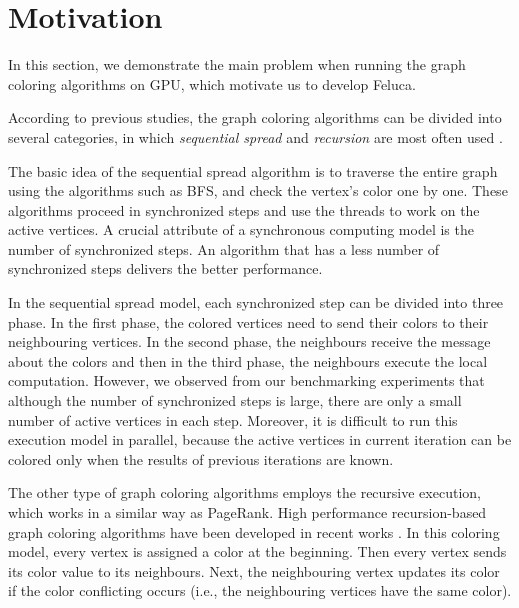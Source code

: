 \section{Motivation}
\label{motivation}

In this section, we demonstrate the main problem when running the graph 
coloring algorithms on GPU, which motivate us to develop Feluca. 

According to previous studies, the graph coloring algorithms can be divided into 
several categories, in which \textit{sequential spread} and \textit{recursion} are most often used \cite{sequential,recursion}. 

The basic idea 
of the sequential spread algorithm is to traverse the entire graph using the algorithms such as BFS, and check the 
vertex's color one by one. These algorithms proceed in synchronized steps and use the 
threads to work on the active vertices.  A crucial attribute of a synchronous computing model is the number of synchronized steps. An algorithm that has a less number of synchronized steps delivers the better performance. 

In the sequential spread model, each synchronized step can be divided into three phase. In the first phase, the colored vertices need to send 
their colors to their neighbouring vertices. In the second phase, the neighbours receive the message about the colors and then in the third phase, the neighbours execute the local computation. However, we observed from our benchmarking experiments that although the number of synchronized steps is large,
there are only a small number of active vertices in each step. Moreover, it is difficult to run this execution model in parallel, because the active vertices in current iteration can be colored only when the results of previous iterations are known.


The other type of graph coloring algorithms employs the recursive execution, which works in a similar way as PageRank. %
High performance recursion-based graph coloring algorithms have been developed in recent works \cite{iterative,Manycore}. %
In this coloring model, every vertex is assigned a color at the beginning. Then every vertex sends its 
color value to its neighbours. Next, the neighbouring vertex updates its color if the color conflicting occurs (i.e., the neighbouring vertices have the same color). 

